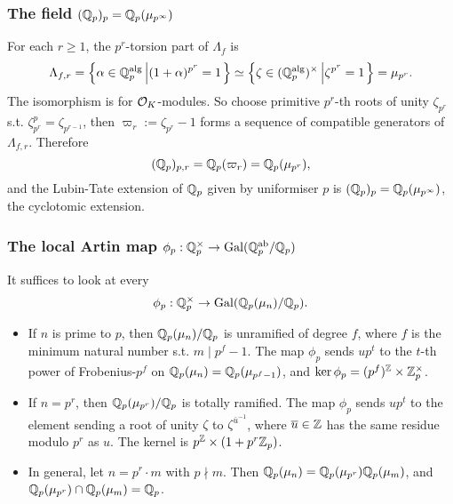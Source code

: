 \subsubsection*{The field \texorpdfstring{$(\mathbb{Q}_p)_p = \mathbb{Q}_p(\mu_{p^\infty})$}{Qpp = Qp mup infty}}

For each $r\ge 1$, the $p^r$-torsion part of $\Lambda_f$ is
\[\Lambda_{f, r} = \left\{\alpha\in\mathbb{Q}_p^{\mathrm{alg}}\left|(1 + \alpha)^{p^r} = 1\right.\right\}\simeq
\left\{\zeta\in(\mathbb{Q}_p^{\mathrm{alg}})^{\times}
\left|\zeta^{p^r} = 1\right.\right\} = \mu_{p^r}.\]
The isomorphism is for $\mathcal{O}_K$-modules.
So choose primitive $p^r$-th roots of unity $\zeta_{p^r}$ s.t. $\zeta_{p^r}^p = \zeta_{p^{r-1}}$,
then $\varpi_r := \zeta_{p^r} - 1$ forms a sequence of compatible generators of $\Lambda_{f, r}$.
Therefore \[(\mathbb{Q}_p)_{p, r} = \mathbb{Q}_p(\varpi_r) = \mathbb{Q}_p(\mu_{p^r}),\]
and the Lubin-Tate extension of $\mathbb{Q}_p$ given by uniformiser $p$ is $(\mathbb{Q}_p)_p = \mathbb{Q}_p(\mu_{p^\infty})$,
the cyclotomic extension.

\subsubsection*{The local Artin map \texorpdfstring{$\phi_p : \mathbb{Q}_p^\times\to \operatorname{Gal}(\mathbb{Q}_p^{\mathrm{ab}}/\mathbb{Q}_p)$}{}}

It suffices to look at every \[\phi_p : \mathbb{Q}_p^\times\to \operatorname{Gal}(\mathbb{Q}_p(\mu_n)/\mathbb{Q}_p).\]
\begin{itemize}
    \item If $n$ is prime to $p$, then $\mathbb{Q}_p(\mu_n)/\mathbb{Q}_p$ is unramified of degree $f$, where $f$ is the minimum natural number s.t. $m\mid p^f - 1$.
    The map $\phi_p$ sends $up^t$ to the $t$-th power of Frobenius-$p^f$ on $\mathbb{Q}_p(\mu_n) = \mathbb{Q}_p(\mu_{p^f - 1})$, and $\ker\phi_p = (p^{f})^{\mathbb{Z}}\times\mathbb{Z}_p^\times$.
    \item If $n = p^r$, then $\mathbb{Q}_p(\mu_{p^r})/\mathbb{Q}_p$ is totally ramified. The map $\phi_p$ sends $up^t$ to the element sending a root of unity $\zeta$ to $\zeta^{\bar u^{-1}}$, where $\overline u\in\mathbb{Z}$ has the same residue modulo $p^r$ as $u$.
    The kernel is $p^{\mathbb{Z}}\times (1 + p^r\mathbb{Z}_p)$.
    \item In general, let $n = p^r\cdot m$ with $p\nmid m$. Then $\mathbb{Q}_p(\mu_n) = \mathbb{Q}_p(\mu_{p^r})\mathbb{Q}_p(\mu_m)$, and $\mathbb{Q}_p(\mu_{p^r})\cap\mathbb{Q}_p(\mu_m) = \mathbb{Q}_p$.
\end{itemize}



